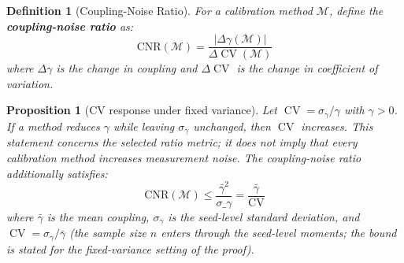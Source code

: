 \documentclass[11pt]{article}
\DeclareMathOperator{\CV}{CV}
\newtheorem{definition}{Definition}
\newtheorem{proposition}[theorem]{Proposition}
\begin{document}
\begin{definition}[Coupling-Noise Ratio]
For a calibration method $\mathcal{M}$, define the \textbf{coupling-noise ratio} as:
\begin{equation}
    \text{CNR}(\mathcal{M}) = \frac{|\Delta\gamma(\mathcal{M})|}{\Delta\CV(\mathcal{M})}
\end{equation}
where $\Delta\gamma$ is the change in coupling and $\Delta\CV$ is the change in coefficient of variation.
\end{definition}

\begin{proposition}[CV response under fixed variance]
Let $\CV=\sigma_\gamma/\gamma$ with $\gamma>0$. If a method reduces $\gamma$ while leaving $\sigma_\gamma$ unchanged, then $\CV$ increases. This statement concerns the selected ratio metric; it does not imply that every calibration method increases measurement noise.
The coupling-noise ratio additionally satisfies:
\begin{equation}
    \text{CNR}(\mathcal{M}) \leq \frac{\bar{\gamma}^2}{\sigma\_{\gamma}} = \frac{\bar{\gamma}}{\CV}
\end{equation}
where $\bar{\gamma}$ is the mean coupling, $\sigma_{\gamma}$ is the seed-level standard deviation, and $\CV = \sigma_{\gamma}/\bar{\gamma}$ (the sample size $n$ enters through the seed-level moments; the bound is stated for the fixed-variance setting of the proof).
\end{proposition}
\end{document}
